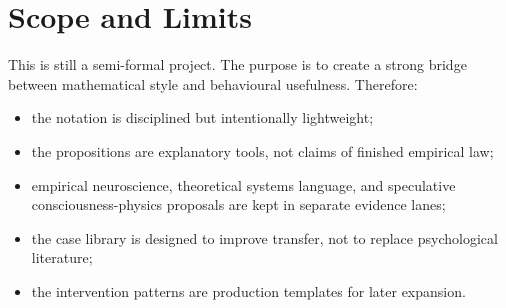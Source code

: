 \section{Scope and Limits}

This is still a semi-formal project. The purpose is to create a strong bridge
between mathematical style and behavioural usefulness. Therefore:
\begin{itemize}[nosep]
  \item the notation is disciplined but intentionally lightweight;
  \item the propositions are explanatory tools, not claims of finished
        empirical law;
  \item empirical neuroscience, theoretical systems language, and speculative
        consciousness-physics proposals are kept in separate evidence lanes;
  \item the case library is designed to improve transfer, not to replace
        psychological literature;
  \item the intervention patterns are production templates for later expansion.
\end{itemize}

